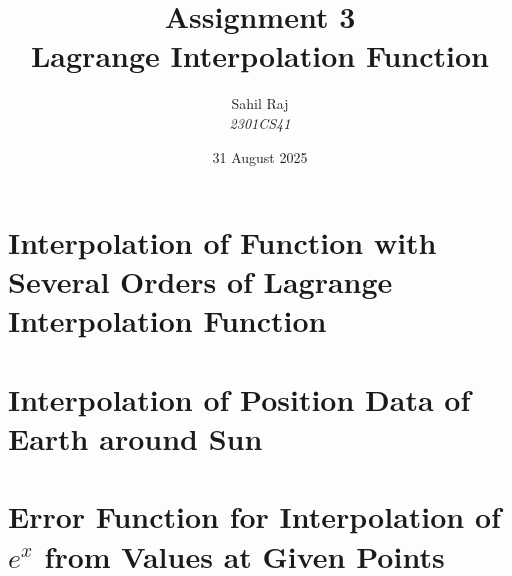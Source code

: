 \documentclass[12pt,a4paper]{report}
\title{\textbf{Assignment 3}\\Lagrange Interpolation Function}
\author{Sahil Raj\\\textit{2301CS41}}
\date{31 August 2025}
\begin{document}
\maketitle
\tableofcontents
\clearpage

\chapter{Interpolation of Function with Several Orders of Lagrange Interpolation Function}


\chapter{Interpolation of Position Data of Earth around Sun}


\chapter{Error Function for Interpolation of $e^{x}$ from Values at Given Points}

\end{document}

